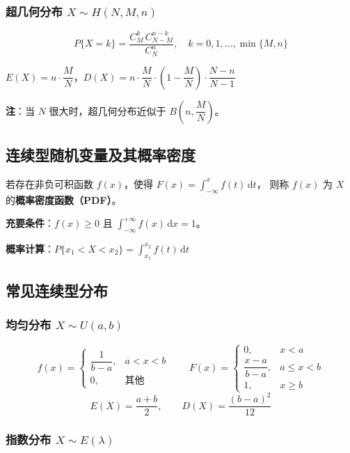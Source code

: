 \documentclass[12pt, a4paper]{article}
\newcommand{\dif}{\,\mathrm{d}}
\begin{document}
\subsubsection{超几何分布 $X\sim H(N,M,n)$}

\[
    P\{X=k\} = \frac{C_M^k\,C_{N-M}^{n-k}}{C_N^n}, \quad
    k=0,1,\ldots,\min\{M,n\}
\]

$E(X)=n\cdot\dfrac{M}{N}$，$D(X)=n\cdot\dfrac{M}{N}\cdot\!\left(1-\dfrac{M}{N}\right)\cdot\dfrac{N-n}{N-1}$

\textbf{注}：当 $N$ 很大时，超几何分布近似于 $B\!\left(n,\dfrac{M}{N}\right)$。

\subsection{连续型随机变量及其概率密度}

\begin{tcolorbox}[defbox, title={概率密度函数}]
    若存在非负可积函数 $f(x)$，使得
    $\displaystyle F(x) = \int_{-\infty}^x f(t)\dif t$，
    则称 $f(x)$ 为 $X$ 的\textbf{概率密度函数（PDF）}。

    \textbf{充要条件}：$f(x)\ge 0$ 且 $\displaystyle\int_{-\infty}^{+\infty}f(x)\dif x=1$。

    \textbf{概率计算}：$P\{x_1<X<x_2\}=\displaystyle\int_{x_1}^{x_2}f(t)\dif t$
\end{tcolorbox}

\subsection{常见连续型分布}

\subsubsection{均匀分布 $X\sim U(a,b)$}

\[
    f(x)=\begin{cases}\dfrac{1}{b-a}, & a<x<b\\[4pt] 0, & \text{其他}\end{cases}
    \qquad
    F(x)=\begin{cases}0, & x<a\\[4pt]\dfrac{x-a}{b-a}, & a\le x<b\\[4pt]1, & x\ge b\end{cases}
\]
\[
    E(X)=\frac{a+b}{2}, \qquad D(X)=\frac{(b-a)^2}{12}
\]

\subsubsection{指数分布 $X\sim E(\lambda)$}
\end{document}
